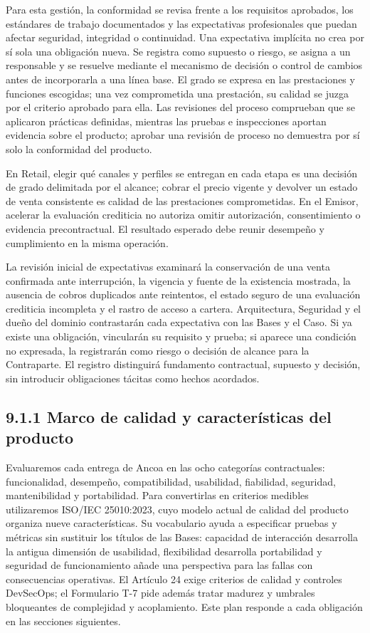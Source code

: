 \documentclass[11pt]{article}
\begin{document}
Para esta gestión, la conformidad se revisa frente a los requisitos aprobados, los estándares de trabajo documentados y las expectativas profesionales que puedan afectar seguridad, integridad o continuidad. Una expectativa implícita no crea por sí sola una obligación nueva. Se registra como supuesto o riesgo, se asigna a un responsable y se resuelve mediante el mecanismo de decisión o control de cambios antes de incorporarla a una línea base. El grado se expresa en las prestaciones y funciones escogidas; una vez comprometida una prestación, su calidad se juzga por el criterio aprobado para ella. Las revisiones del proceso comprueban que se aplicaron prácticas definidas, mientras las pruebas e inspecciones aportan evidencia sobre el producto; aprobar una revisión de proceso no demuestra por sí solo la conformidad del producto.

En Retail, elegir qué canales y perfiles se entregan en cada etapa es una decisión de grado delimitada por el alcance; cobrar el precio vigente y devolver un estado de venta consistente es calidad de las prestaciones comprometidas. En el Emisor, acelerar la evaluación crediticia no autoriza omitir autorización, consentimiento o evidencia precontractual. El resultado esperado debe reunir desempeño y cumplimiento en la misma operación.

La revisión inicial de expectativas examinará la conservación de una venta confirmada ante interrupción, la vigencia y fuente de la existencia mostrada, la ausencia de cobros duplicados ante reintentos, el estado seguro de una evaluación crediticia incompleta y el rastro de acceso a cartera. Arquitectura, Seguridad y el dueño del dominio contrastarán cada expectativa con las Bases y el Caso. Si ya existe una obligación, vincularán su requisito y prueba; si aparece una condición no expresada, la registrarán como riesgo o decisión de alcance para la Contraparte. El registro distinguirá fundamento contractual, supuesto y decisión, sin introducir obligaciones tácitas como hechos acordados.

\subsection{9.1.1 Marco de calidad y características del producto}

Evaluaremos cada entrega de Ancoa en las ocho categorías contractuales: funcionalidad, desempeño, compatibilidad, usabilidad, fiabilidad, seguridad, mantenibilidad y portabilidad. Para convertirlas en criterios medibles utilizaremos ISO/IEC 25010:2023, cuyo modelo actual de calidad del producto organiza nueve características. Su vocabulario ayuda a especificar pruebas y métricas sin sustituir los títulos de las Bases: capacidad de interacción desarrolla la antigua dimensión de usabilidad, flexibilidad desarrolla portabilidad y seguridad de funcionamiento añade una perspectiva para las fallas con consecuencias operativas. El Artículo 24 exige criterios de calidad y controles DevSecOps; el Formulario T-7 pide además tratar madurez y umbrales bloqueantes de complejidad y acoplamiento. Este plan responde a cada obligación en las secciones siguientes.
\end{document}
